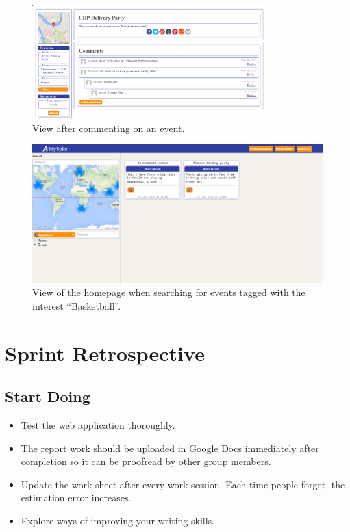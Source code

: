 \begin{figure}[ht!]
  \centering
  \includegraphics[width=90mm]{Sprint5/img/test6.png}
  \caption{View after commenting on an event. }
  \label{fig:S5TestAfterComment}
\end{figure}

\begin{figure}[ht!]
  \centering
  \includegraphics[width=\linewidth]{Sprint5/img/test7.png}
  \caption{View of the homepage when searching for events tagged with the interest ``Basketball''. }
  \label{fig:S5TestEventSearchTag}
\end{figure}

\newpage
\section{Sprint Retrospective}
\label{sec:S5Retrospective}

\subsection{Start Doing}
\label{subsec:S5RetrospectiveStart}

\begin{itemize}
  \item Test the web application thoroughly.
  \item The report work should be uploaded in Google Docs immediately after completion so it can be proofread by other group members.
  \item Update the work sheet after every work session. Each time people forget, the estimation error increases. 
  \item Explore ways of improving your writing skills. 
\end{itemize}

